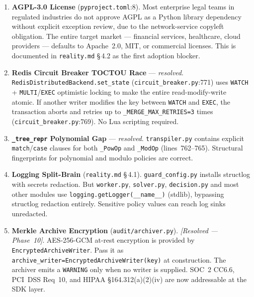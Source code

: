 \documentclass[12pt,a4paper,oneside]{report}
\newcommand{\fname}[1]{\texttt{#1}}          %
\newcommand{\code}[1]{\texttt{#1}}           %
\newcommand{\cfrsec}[1]{\S\,#1}             %
\begin{document}
\begin{enumerate}
  \item \textbf{AGPL-3.0 License} (\fname{pyproject.toml}:8). Most enterprise
        legal teams in regulated industries do not approve AGPL as a Python
        library dependency without explicit exception review, due to the
        network-service copyleft obligation. The entire target market ---
        financial services, healthcare, cloud providers --- defaults to
        Apache~2.0, MIT, or commercial licenses. This is documented in
        \fname{reality.md} \cfrsec{4.2} as the first adoption blocker.

  \item \textbf{Redis Circuit Breaker TOCTOU Race} --- \textit{resolved}.
        \code{RedisDistributedBackend.set\_state}
        (\fname{circuit\_breaker.py}:771) uses \code{WATCH} +
        \code{MULTI}/\code{EXEC} optimistic locking to make the entire
        read-modify-write atomic.  If another writer modifies the key between
        \code{WATCH} and \code{EXEC}, the transaction aborts and retries up
        to \code{\_MERGE\_MAX\_RETRIES=3} times (\fname{circuit\_breaker.py}:769).
        No Lua scripting required.

  \item \textbf{\code{\_tree\_repr} Polynomial Gap} --- \textit{resolved}.
        \fname{transpiler.py} contains explicit \code{match}/\code{case}
        clauses for both \code{\_PowOp} and \code{\_ModOp} (lines~762--765).
        Structural fingerprints for polynomial and modulo policies are correct.

  \item \textbf{Logging Split-Brain} (\fname{reality.md} \cfrsec{4.1}).
        \fname{guard\_config.py} installs structlog with secrets redaction.
        But \fname{worker.py}, \fname{solver.py}, \fname{decision.py} and most
        other modules use \code{logging.getLogger(\_\_name\_\_)} (stdlib),
        bypassing structlog redaction entirely. Sensitive policy values can
        reach log sinks unredacted.

  \item \textbf{Merkle Archive Encryption} (\fname{audit/archiver.py}).
        \textit{[Resolved — Phase~10]}. AES-256-GCM at-rest encryption is
        provided by \code{EncryptedArchiveWriter}.  Pass it as
        \code{archive\_writer=EncryptedArchiveWriter(key)} at construction.
        The archiver emits a \code{WARNING} only when no writer is supplied.
        SOC~2 CC6.6, PCI~DSS Req~10, and HIPAA \S164.312(a)(2)(iv) are
        now addressable at the SDK layer.


\end{enumerate}
\end{document}
